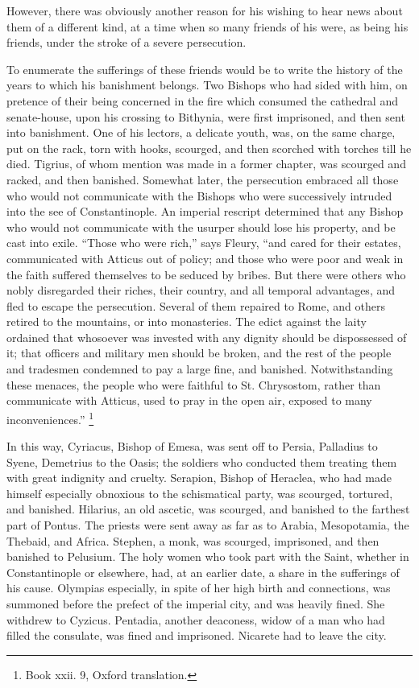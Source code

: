 However, there was obviously another reason for his wishing to hear
news about them of a different kind, at a time when so many friends of
his were, as being his friends, under the stroke of a severe
persecution.

To enumerate the sufferings of these friends would be to write the
history of the years to which his banishment belongs. Two Bishops who
had sided with him, on pretence of their being concerned in the fire
which consumed the cathedral and senate-house, upon his crossing to
Bithynia, were first imprisoned, and then sent into banishment. One of
his lectors, a delicate youth, was, on the same charge, put on the
rack, torn with hooks, scourged, and then scorched with torches till
he died. Tigrius, of whom mention was made in a former chapter, was
scourged and racked, and then banished. Somewhat later, the
persecution embraced all those who would not communicate with the
Bishops who were successively intruded into the see of Constantinople.
An imperial rescript determined that any Bishop who would not
communicate with the usurper should lose his property, and be cast
into exile. ``Those who were rich,'' says Fleury, ``and
cared for their estates, communicated with Atticus out of policy; and
those who were poor and weak in the faith suffered themselves to be
seduced by bribes. But there were others who nobly disregarded their
riches, their country, and all temporal advantages, and fled to escape
the persecution. Several of them repaired to Rome, and others retired
to the mountains, or into monasteries. The edict against the laity
ordained that whosoever was invested with any dignity should be
dispossessed of it; that officers and military men should be
broken, and the rest of the people and tradesmen condemned to pay a
large fine, and banished. Notwithstanding these menaces, the people
who were faithful to St. Chrysostom, rather than communicate with
Atticus, used to pray in the open air, exposed to many
inconveniences.'' \footnote{Book xxii. 9, Oxford translation.}

In this way, Cyriacus, Bishop of Emesa, was sent off to Persia,
Palladius to Syene, Demetrius to the Oasis; the soldiers who conducted
them treating them with great indignity and cruelty. Serapion, Bishop
of Heraclea, who had made himself especially obnoxious to the
schismatical party, was scourged, tortured, and banished. Hilarius, an
old ascetic, was scourged, and banished to the farthest part of
Pontus. The priests were sent away as far as to Arabia, Mesopotamia,
the Thebaid, and Africa. Stephen, a monk, was scourged, imprisoned,
and then banished to Pelusium. The holy women who took part with the
Saint, whether in Constantinople or elsewhere, had, at an earlier
date, a share in the sufferings of his cause. Olympias especially, in
spite of her high birth and connections, was summoned before the
prefect of the imperial city, and was heavily fined. She withdrew to
Cyzicus. Pentadia, another deaconess, widow of a man who had filled
the consulate, was fined and imprisoned. Nicarete had to leave the
city.

